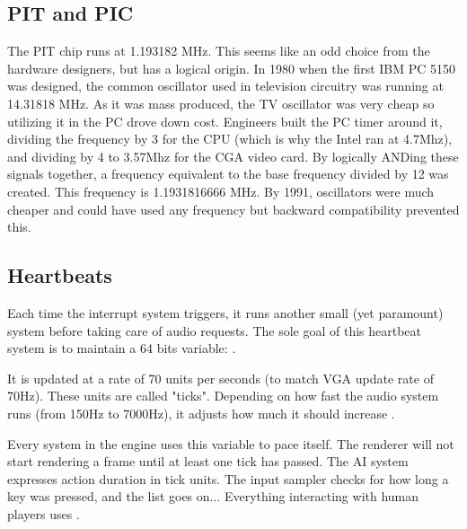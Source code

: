 \subsection{PIT and PIC}
The PIT chip runs at 1.193182 MHz. This seems like an odd choice from the hardware designers, but has a logical origin. In 1980 when the first IBM PC 5150 was designed, the common oscillator used in television circuitry was running at 14.31818 MHz. As it was mass produced, the TV oscillator was very cheap so utilizing it in the PC drove down cost. Engineers built the PC timer around it, dividing the frequency by 3 for the CPU (which is why the Intel ran at 4.7Mhz), and dividing by 4 to 3.57Mhz for the CGA video card. By logically ANDing these signals together, a frequency equivalent to the base frequency divided by 12 was created. This frequency is 1.1931816666 MHz. By 1991, oscillators were much cheaper and could have used any frequency but backward compatibility prevented this.\\
\par














\subsection{Heartbeats}
Each time the interrupt system triggers, it runs another small (yet paramount) system before taking care of audio requests. The sole goal of this heartbeat system is to maintain a 64 bits variable: .\\
\par
\begin{minipage}{\textwidth}

\end{minipage}
\par
It is updated at a rate of 70 units per seconds (to match VGA update rate of 70Hz). These units are called "ticks". Depending on how fast the audio system runs (from 150Hz to 7000Hz), it adjusts how much it should increase .\\
\par
Every system in the engine uses this variable to pace itself. The renderer will not start rendering a frame until at least one tick has passed. The AI system expresses action duration in tick units. The input sampler checks for how long a key was pressed, and the list goes on... Everything interacting with human players uses .\\













